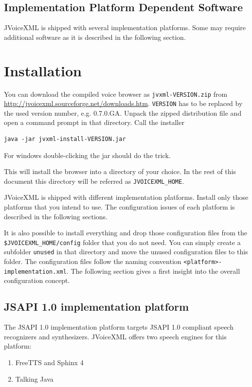 \documentclass[11pt,a4paper]{article}
\begin{document}
\subsection{Implementation Platform Dependent Software}

JVoiceXML is shipped with several implementation platforms. Some may require
additional software as it is described in the following section.

\section{Installation}

You can download the compiled voice browser as \texttt{jvxml-VERSION.zip} from 
\url{http://jvoicexml.sourceforge.net/downloads.htm}.
\texttt{VERSION} has to be replaced by the used version number, e.g. 0.7.0.GA.
Unpack the zipped distribution file and open a command prompt in that
directory. Call the installer 

\begin{lstlisting}
java -jar jvxml-install-VERSION.jar
\end{lstlisting}

For windows double-clicking the jar should do the trick. 

This will install the browser into a directory of your choice. In the rest of 
this document this directory will be referred as \lstinline{JVOICEXML_HOME}.

JVoiceXML is shipped with different implementation platforms. Install only
those platforms that you intend to use. The configuration issues of each
platform is described in the following sections.

It is also possible to install everything and drop those configuration files
from the \lstinline{$JVOICEXML_HOME/config} folder that you do not need. You
can simply create a subfolder \lstinline{unused} in that directory and move the
unused configuration files to this folder. The configuration files follow the
naming convention \lstinline{<platform>-implementation.xml}. The following
section gives a first insight into the overall configuration concept.

\subsection{JSAPI 1.0 implementation platform}

The JSAPI 1.0 implementation platform targets JSAPI 1.0 compliant speech
recognizers and synthesizers. JVoiceXML offers two speech engines for this
platform:
\begin{enumerate}
  \item FreeTTS and Sphinx 4
  \item Talking Java
\end{enumerate}
\end{document}
